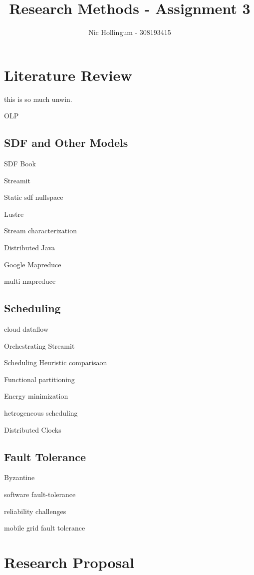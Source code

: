 
\author{Nic Hollingum - 308193415}
\title{Research Methods - Assignment 3}



\maketitle

\section*{Literature Review}

this is so much unwin.

OLP \cite{hen99}

\subsection*{SDF and Other Models}

SDF Book \cite{sdfBook}

Streamit \cite{thies02}

Static sdf nullspace \cite{lee87}

Lustre \cite{cas87}

Stream characterization \cite{thies10}

Distributed Java \cite{par03}

Google Mapreduce \cite{dea08}

multi-mapreduce \cite{ran07}

\subsection*{Scheduling}

cloud dataflow \cite{tsa09}

Orchestrating Streamit \cite{mal08}

Scheduling Heuristic comparisaon \cite{Kha94}

Functional partitioning \cite{li10}

Energy minimization \cite{boy01}

hetrogeneous scheduling \cite{len87}

Distributed Clocks \cite{lam78}

\subsection*{Fault Tolerance}

Byzantine \cite{lam86}

software fault-tolerance \cite{ran75}

reliability challenges \cite{ree06}

mobile grid fault tolerance\cite{lit07}

\section*{Research Proposal}





